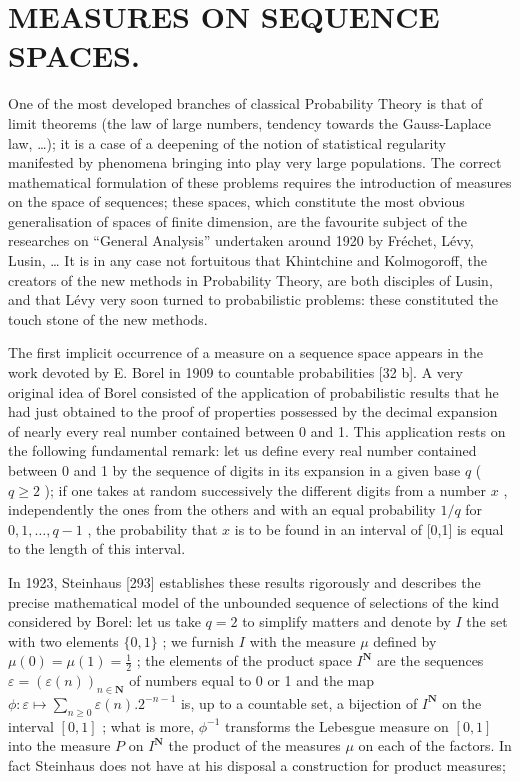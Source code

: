 \section*{MEASURES ON SEQUENCE SPACES.}
{}

One of the most developed branches of classical Probability Theory is that of limit theorems (the law of large numbers, tendency towards the Gauss-Laplace law, \ldots); it is a case of a deepening of the notion of statistical regularity manifested by phenomena bringing into play very large populations. The correct mathematical formulation of these problems requires the introduction of measures on the space of sequences; these spaces, which constitute the most obvious generalisation of spaces of finite dimension, are the favourite subject of the researches on ``General Analysis'' undertaken around 1920 by Fréchet, Lévy, Lusin, \ldots{} It is in any case not fortuitous that Khintchine and Kolmogoroff, the creators of the new methods in Probability Theory, are both disciples of Lusin, and that Lévy very soon turned to probabilistic problems: these constituted the touch stone of the new methods.

The first implicit occurrence of a measure on a sequence space appears in the work devoted by E. Borel in 1909 to countable probabilities {[}32 b{]}. A very original idea of Borel consisted of the application of probabilistic results that he had just obtained to the proof of properties possessed by the decimal expansion of nearly every real number contained between 0 and 1. This application rests on the following fundamental remark: let us define every real number contained between 0 and 1 by the sequence of digits in its expansion in a given base \(q\) ( \(q \geq 2\) ); if one takes at random successively the different digits from a number \(x\) , independently the ones from the others and with an equal probability \(1/q\) for \(0,1,\ldots,q-1\) , the probability that \(x\) is to be found in an interval of [0,1] is equal to the length of this interval.

In 1923, Steinhaus {[}293{]} establishes these results rigorously and describes the precise mathematical model of the unbounded sequence of selections of the kind considered by Borel: let us take \(q = 2\) to simplify matters and denote by \(I\) the set with two elements \(\{0,1\}\) ; we furnish \(I\) with the measure \(\mu\) defined by \(\mu(0) = \mu(1) = \frac{1}{2}\) ; the elements of the product space \(I^{\mathbf{N}}\) are the sequences \(\varepsilon = (\varepsilon(n))_{n \in \mathbf{N}}\) of numbers equal to 0 or 1 and the map \(\phi : \varepsilon \mapsto \sum_{n \geq 0} \varepsilon(n). 2^{-n-1}\) is, up to a countable set, a bijection of \(I^{\mathbf{N}}\) on the interval \([0,1]\) ; what is more, \(\phi^{-1}\) transforms the Lebesgue measure on \([0,1]\) into the measure \(P\) on \(I^{\mathbf{N}}\) the product of the measures \(\mu\) on each of the factors. In fact Steinhaus does not have at his disposal a construction for product measures;

